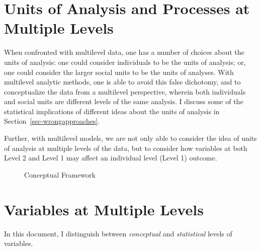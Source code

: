\documentclass[
  letterpaper,
  DIV=11,
  numbers=noendperiod]{scrreprt}
\begin{document}
\section{Units of Analysis and Processes at Multiple
Levels}\label{units-of-analysis-and-processes-at-multiple-levels}

When confronted with multilevel data, one has a number of choices about
the units of analysis: one could consider individuals to be the units of
analysis; or, one could consider the larger social units to be the units
of analyses. With multilevel analytic methods, one is able to avoid this
false dichotomy, and to conceptualize the data from a multilevel
perspective, wherein both individuals and social units are different
levels of the same analysis. I discuss some of the statistical
implications of different ideas about the units of analysis in
Section~\ref{sec-wrongapproaches}.

Further, with multilevel models, we are not only able to consider the
idea of units of analysis at multiple levels of the data, but to
consider how variables at both Level 2 and Level 1 may affect an
individual level (Level 1) outcome.

\begin{figure}


\caption{\label{fig-conceptual}Conceptual Framework}

\end{figure}%

\section{Variables at Multiple Levels}\label{sec-levels}

In this document, I distinguish between \emph{conceptual} and
\emph{statistical} levels of variables.
\end{document}
